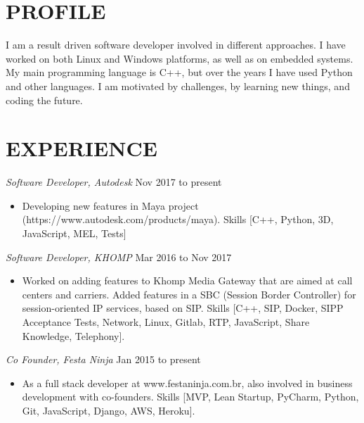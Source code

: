 \documentclass[line,margin]{res}
\begin{document}
\address{alvarofleith@gmail.com or +55 (48) 98458-9879}
\address{https://linkedin.com/in/alvarofleith}


\begin{resume}

\section{PROFILE}       I am a result driven software developer involved in different approaches. I have worked on both Linux and Windows platforms, as well as on embedded systems. My main programming language is C++, but over the years I have used Python and other languages. I am motivated by challenges, by learning new things, and coding the future.


 \section{EXPERIENCE} {\sl Software Developer, Autodesk} \hfill Nov 2017 to present \\
                 \begin{itemize}  \itemsep -2pt
                 \item Developing new features in Maya project (https://www.autodesk.com/products/maya). Skills [C++, Python, 3D, JavaScript, MEL, Tests]
                \end{itemize}
 
                {\sl Software Developer, KHOMP} \hfill Mar 2016 to Nov 2017 \\
                 \begin{itemize}  \itemsep -2pt
                 \item Worked on adding features to Khomp Media Gateway that are aimed at call centers and carriers. Added features in a SBC (Session Border Controller) for session-oriented IP services, based on SIP. Skills [C++, SIP, Docker, SIPP Acceptance Tests, Network, Linux, Gitlab, RTP, JavaScript, Share Knowledge, Telephony].
                \end{itemize}

                {\sl Co Founder, Festa Ninja} \hfill Jan 2015 to present \\
                 \begin{itemize}  \itemsep -2pt
                 \item As a full stack developer at www.festaninja.com.br, also involved in business development with co-founders. Skills [MVP, Lean Startup, PyCharm, Python, Git, JavaScript, Django, AWS, Heroku].
                 \end{itemize}


\end{resume}
\end{document}
